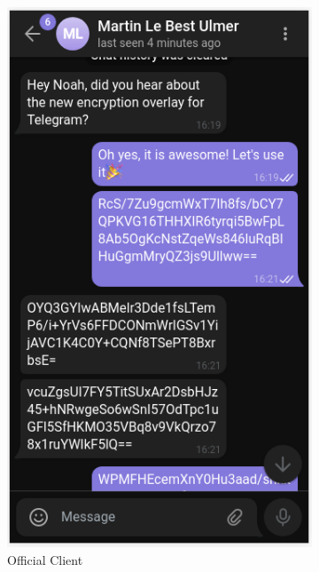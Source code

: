 \documentclass[a4paper, oneside]{discothesis}
\begin{document}
\begin{figure}[h]
\begin{subfigure}{.5\textwidth}
  \includegraphics[width=.8\linewidth]{figures/chat_plain.png}
  \caption{Official Client}
  \label{fig:chat_plain}
\end{subfigure}%
\begin{subfigure}{.5\textwidth}
  \centering

\end{subfigure}
\end{figure}
\end{document}
